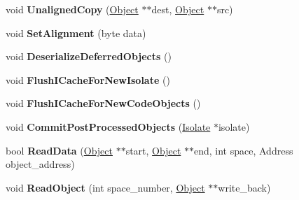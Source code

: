 \begin{DoxyCompactItemize}
\item 
void {\bfseries Unaligned\+Copy} (\hyperlink{classv8_1_1internal_1_1_object}{Object} $\ast$$\ast$dest, \hyperlink{classv8_1_1internal_1_1_object}{Object} $\ast$$\ast$src)\hypertarget{classv8_1_1internal_1_1_deserializer_a163861aed6fe819e61e6339a4f14d5a4}{}\label{classv8_1_1internal_1_1_deserializer_a163861aed6fe819e61e6339a4f14d5a4}

\item 
void {\bfseries Set\+Alignment} (byte data)\hypertarget{classv8_1_1internal_1_1_deserializer_ac91f9605481ac117e62236e30b45e653}{}\label{classv8_1_1internal_1_1_deserializer_ac91f9605481ac117e62236e30b45e653}

\item 
void {\bfseries Deserialize\+Deferred\+Objects} ()\hypertarget{classv8_1_1internal_1_1_deserializer_a89963f6dbee71f8241c29da5d8c9e4df}{}\label{classv8_1_1internal_1_1_deserializer_a89963f6dbee71f8241c29da5d8c9e4df}

\item 
void {\bfseries Flush\+I\+Cache\+For\+New\+Isolate} ()\hypertarget{classv8_1_1internal_1_1_deserializer_a6cbf1aca00ce953e28d4965f28f3f395}{}\label{classv8_1_1internal_1_1_deserializer_a6cbf1aca00ce953e28d4965f28f3f395}

\item 
void {\bfseries Flush\+I\+Cache\+For\+New\+Code\+Objects} ()\hypertarget{classv8_1_1internal_1_1_deserializer_afd13530e71f5186f86ec04cc367cece1}{}\label{classv8_1_1internal_1_1_deserializer_afd13530e71f5186f86ec04cc367cece1}

\item 
void {\bfseries Commit\+Post\+Processed\+Objects} (\hyperlink{classv8_1_1internal_1_1_isolate}{Isolate} $\ast$isolate)\hypertarget{classv8_1_1internal_1_1_deserializer_aff62e62f2d50e367fa2caef1626ddc76}{}\label{classv8_1_1internal_1_1_deserializer_aff62e62f2d50e367fa2caef1626ddc76}

\item 
bool {\bfseries Read\+Data} (\hyperlink{classv8_1_1internal_1_1_object}{Object} $\ast$$\ast$start, \hyperlink{classv8_1_1internal_1_1_object}{Object} $\ast$$\ast$end, int space, Address object\+\_\+address)\hypertarget{classv8_1_1internal_1_1_deserializer_ae824a1f18d80a209ada189b8339504e6}{}\label{classv8_1_1internal_1_1_deserializer_ae824a1f18d80a209ada189b8339504e6}

\item 
void {\bfseries Read\+Object} (int space\+\_\+number, \hyperlink{classv8_1_1internal_1_1_object}{Object} $\ast$$\ast$write\+\_\+back)\hypertarget{classv8_1_1internal_1_1_deserializer_aed8be927e99ccf0348ec2fddf4884d9d}{}\label{classv8_1_1internal_1_1_deserializer_aed8be927e99ccf0348ec2fddf4884d9d}


\end{DoxyCompactItemize}
